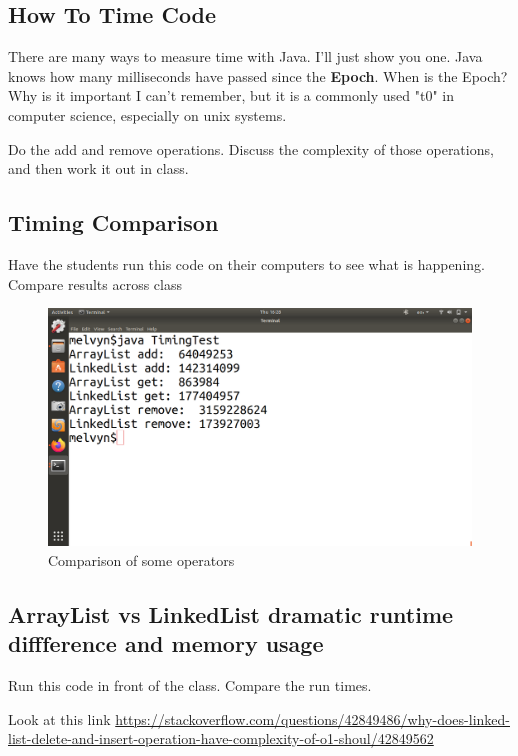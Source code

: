 \documentclass[10pt]{article}
\begin{document}
\subsection{How To Time Code}
There are many ways to measure time with Java. I'll just show you one. Java knows how many milliseconds have passed since the \textbf{Epoch}. When is the Epoch? Why is it important I can't remember, but it is a commonly used "t0" in computer science, especially on unix systems. 

Do the add and remove operations. Discuss the complexity of those operations, and then work it out in class.

\subsection{Timing Comparison}

Have the students run this code on their computers to see what is happening. Compare results across class




\begin{figure}[h]
  \centering
    \includegraphics[width=\textwidth]{outputOfTimingTest.png}
  \caption{Comparison of some operators}
\end{figure}


\subsection{ArrayList vs LinkedList dramatic runtime diffference and memory
usage}

Run this code in front of the class. Compare the run times.

Look at this link
\url{https://stackoverflow.com/questions/42849486/why-does-linked-list-delete-and-insert-operation-have-complexity-of-o1-shoul/42849562}
\end{document}
